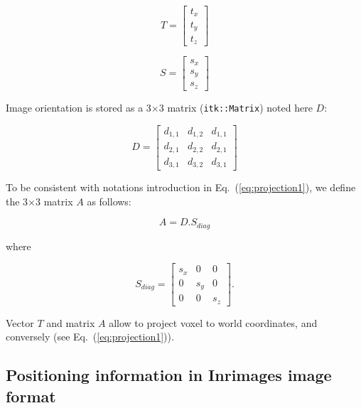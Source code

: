 \begin{equation}
T = \begin{bmatrix} t_x \\ t_y \\ t_z \end{bmatrix}
\end{equation}

\begin{equation}
S = \begin{bmatrix} s_x \\ s_y \\ s_z \end{bmatrix}
\end{equation}

Image orientation is stored as a 3$\times$3 matrix (\texttt{itk::Matrix}) noted here $D$:

\begin{equation}
D =
\begin{bmatrix}
d_{1,1} & d_{1,2} & d_{1,1} \\
d_{2,1} & d_{2,2} & d_{2,1} \\
d_{3,1} & d_{3,2} & d_{3,1}
\end{bmatrix}
\end{equation}

To be consistent with notations introduction in Eq.~(\ref{eq:projection1}), we define the 3$\times$3 matrix $A$ as follows:

\begin{equation}
A=D.S_{diag}
\end{equation}

where 

\begin{equation}
S_{diag} =
\begin{bmatrix}
s_x & 0 & 0 \\
0 & s_y & 0 \\
0 & 0 & s_z
\end{bmatrix}.
\end{equation}

Vector $T$ and matrix $A$ allow to project voxel to world coordinates, and conversely (see Eq.~(\ref{eq:projection1})).



\subsection{Positioning information in Inrimages image format}

